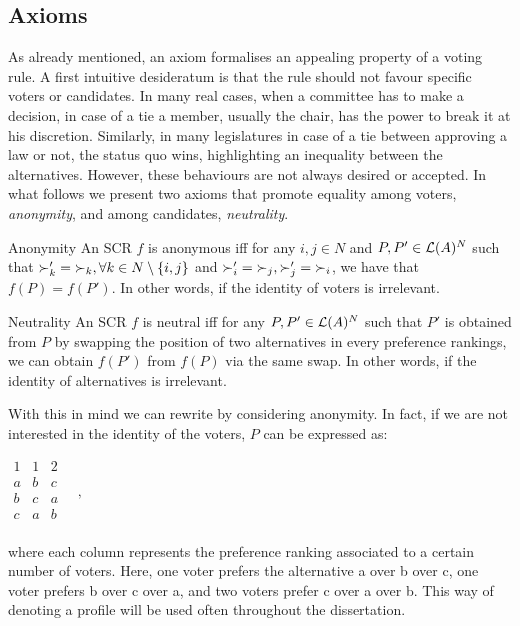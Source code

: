 \subsection{Axioms}
As already mentioned, an axiom formalises an appealing property of a voting rule.
A first intuitive desideratum is that the rule should not favour specific voters or candidates.
In many real cases, when a committee has to make a decision, in case of a tie a member, usually the chair, has the power to break it at his discretion.
Similarly, in many legislatures in case of a tie between approving a law or not, the status quo wins, highlighting an inequality between the alternatives.
However, these behaviours are not always desired or accepted. In what follows we present two axioms that promote equality among voters, \textit{anonymity}, and among candidates, \textit{neutrality}. 

	\begin{genthm}{Anonymity}
	An \acs{SCR} $f$ is anonymous iff for any $i,j \in N$ and $P,P'\in\mathcal{L}(A)^{N}$ such that $\mathop{\succ'_k}=\mathop{\succ_k}, \forall k \in {N \setminus\{i,j\}}$ and $\mathop{\succ'_i}=\mathop{\succ_j}, \mathop{\succ'_j}=\mathop{\succ_i}$, we have that $f(P)=f(P')$. In other words, if the identity of voters is irrelevant.
	\end{genthm}

	\begin{genthm}{Neutrality}
	An \acs{SCR} $f$ is neutral iff for any $P,P'\in\mathcal{L}(A)^{N}$ such that $P'$ is obtained from $P$ by swapping the position of two alternatives in every preference rankings, we can obtain $f(P')$ from $f(P)$ via the same swap. In other words, if the identity of alternatives is irrelevant.	
	\end{genthm}

	\begin{example}
		\label{ex:anonymousprofile}
		With this in mind we can rewrite  by considering anonymity. In fact, if we are not interested in the identity of the voters, $P$ can be expressed as:
		\begin{center}
			$
			\begin{array}{ccc}
				1 & 1 & 2 \\
				a &	b & c \\
				b &	c & a \\
				c &	a & b \\
			\end{array} \quad, 
			$
		\end{center}
		where each column represents the preference ranking associated to a certain number of voters. Here, one voter prefers the alternative a over b over c, one voter prefers b over c over a, and two voters prefer c over a over b. 
		This way of denoting a profile will be used often throughout the dissertation.
	\end{example}

